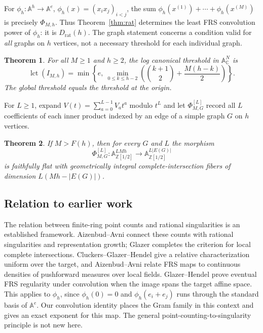 \documentclass[11pt]{article}
\numberwithin{equation}{section}
\newtheorem{theorem}{Theorem}[section]
\theoremstyle{remark}
\newcommand{\A}{\mathbb A}
\newcommand{\C}{\mathbb C}
\newcommand{\Z}{\mathbb Z}
\newcommand{\lct}{\operatorname{lct}}
\newcommand{\Drat}{D_{\mathrm{rat}}}
\begin{document}
For $\phi_h:\A^h\to\A^e$, $\phi_h(x)=(x_ix_j)_{i<j}$, the sum
$\phi_h(x^{(1)})+\cdots+\phi_h(x^{(M)})$ is precisely $\Phi_{M,h}$.
Thus Theorem~\ref{thm:rat} determines the least FRS convolution power
of $\phi_h$: it is $\Drat(h)$. The graph statement concerns a condition
valid for \emph{all} graphs on $h$ vertices, not a necessary threshold
for each individual graph.

\begin{theorem}\label{thm:lct}
For all $M\ge1$ and $h\ge2$, the log canonical threshold in $\A^N_\C$ is
\begin{equation}\label{eq:lct}
 \lct(I_{M,h})
 =\min\left\{e,\ \min_{0\le k\le h-2}
       \left(\binom{k+1}{2}+\frac{M(h-k)}2\right)\right\}.
\end{equation}
The global threshold equals the threshold at the origin.
\end{theorem}

For $L\ge1$, expand
$V(t)=\sum_{a=0}^{L-1}V_a t^a$ modulo $t^L$ and let $\Phi^{[L]}_{M,G}$
record all $L$ coefficients of each inner product indexed by an edge
of a simple graph $G$ on $h$ vertices.

\begin{theorem}\label{thm:coeff}
If $M>F(h)$, then for every $G$ and $L$ the morphism
\[
 \Phi^{[L]}_{M,G}:\A_{\Z[1/2]}^{LMh}
       \longrightarrow\A_{\Z[1/2]}^{L|E(G)|}
\]
is faithfully flat with geometrically integral complete-intersection
fibers of dimension $L(Mh-|E(G)|)$.
\end{theorem}

\subsection{Relation to earlier work}
The relation between finite-ring point counts and rational singularities
is an established framework. Aizenbud--Avni \cite{AAcount} connect these
counts with rational singularities and representation growth; Glazer
\cite{Glazer} completes the criterion for local complete intersections.
Cluckers--Glazer--Hendel \cite{CGH} give a relative characterization
uniform over the target, and Aizenbud--Avni \cite{AAfrs} relate FRS maps
to continuous densities of pushforward measures over local fields.
Glazer--Hendel \cite[Theorem 1.7]{GH} prove eventual FRS regularity under
convolution when the image spans the target affine space. This applies
to $\phi_h$, since $\phi_h(0)=0$ and $\phi_h(e_i+e_j)$ runs through the
standard basis of $\A^e$. Our convolution identity places the Gram
family in this context and gives an exact exponent for this map.
The general point-counting-to-singularity principle is not new here.
\end{document}
